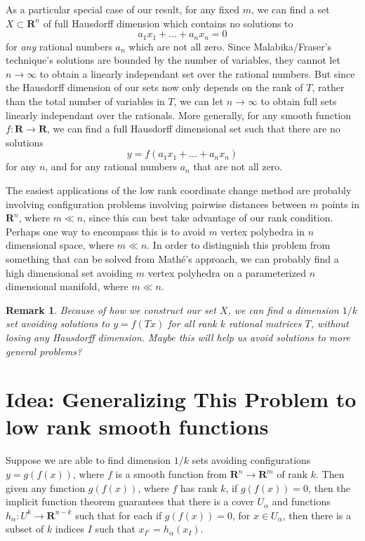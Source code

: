 \documentclass{report}
\theoremstyle{plain}
\theoremstyle{plain}
\newtheorem*{remark}{Remark}
\begin{document}
As a particular special case of our result, for any fixed $m$, we can find a set $X \subset \mathbf{R}^n$ of full Hausdorff dimension which contains no solutions to
%
\[ a_1x_1 + \dots + a_nx_n = 0 \]
%
for {\it any} rational numbers $a_n$ which are not all zero. Since Malabika/Fraser's technique's solutions are bounded by the number of variables, they cannot let $n \to \infty$ to obtain a linearly independant set over the rational numbers. But since the Hausdorff dimension of our sets now only depends on the rank of $T$, rather than the total number of variables in $T$, we can let $n \to \infty$ to obtain full sets linearly independant over the rationals. More generally, for any smooth function $f: \mathbf{R} \to \mathbf{R}$, we can find a full Hausdorff dimensional set such that there are no solutions
%
\[ y = f(a_1x_1 + \dots + a_nx_n) \]
%
for any $n$, and for any rational numbers $a_n$ that are not all zero.

The easiest applications of the low rank coordinate change method are probably involving configuration problems involving pairwise distances between $m$ points in $\mathbf{R}^n$, where $m \ll n$, since this can best take advantage of our rank condition. Perhaps one way to encompass this is to avoid $m$ vertex polyhedra in $n$ dimensional space, where $m \ll n$. In order to distinguish this problem from something that can be solved from Math\'{e}'s approach, we can probably find a high dimensional set avoiding $m$ vertex polyhedra on a parameterized $n$ dimensional manifold, where $m \ll n$.

\begin{remark}
    Because of how we construct our set $X$, we can find a dimension $1/k$ set avoiding solutions to $y = f(Tx)$ for {\it all} rank $k$ rational matrices $T$, without losing any Hausdorff dimension. Maybe this will help us avoid solutions to more general problems?
\end{remark}

\section{Idea: Generalizing This Problem to low rank smooth functions}

Suppose we are able to find dimension $1/k$ sets avoiding configurations $y = g(f(x))$, where $f$ is a smooth function from $\mathbf{R}^n \to \mathbf{R}^m$ of rank $k$. Then given any function $g(f(x))$, where $f$ has rank $k$, if $g(f(x)) = 0$, then the implicit function theorem guarantees that there is a cover $U_\alpha$ and functions $h_\alpha: U^k \to \mathbf{R}^{n-k}$ such that for each if $g(f(x)) = 0$, for $x \in U_\alpha$, then there is a subset of $k$ indices $I$ such that $x_{I^c} = h_\alpha(x_I)$.
\end{document}
